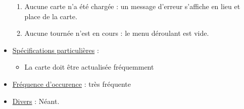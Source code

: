 \documentclass[a4paper]{report}
\begin{document}
\begin{itemize}[label = \textbullet, font = \color{orange}]
    \begin{enumerate}
        \item Aucune carte n'a été chargée : un message d'erreur s'affiche en
            lieu et place de la carte.
        \item Aucune tournée n'est en cours : le menu déroulant est vide.
    \end{enumerate}
    \item \underline{Spécifications particulières} :
    \begin{itemize}[label = \textbullet, font = \color{blue}]
        \item La carte doit être actualisée fréquemment
    \end{itemize}
    \item \underline{Fréquence d'occurence} : très fréquente
    \item \underline{Divers} : Néant.
\end{itemize}
\end{document}
